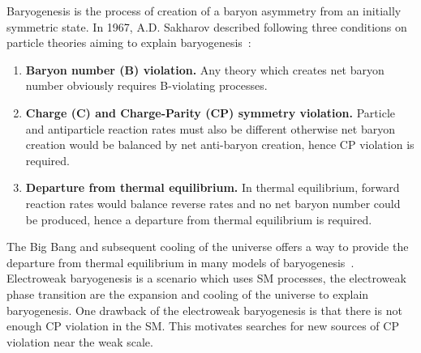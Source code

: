 
Baryogenesis is the process of creation of a baryon asymmetry from an initially symmetric state. In 1967, A.D. Sakharov described following three conditions on particle theories aiming to explain baryogenesis~\cite{Sakharov:1967dj}:
\begin{enumerate}
    \item {\bf Baryon number (B) violation.} Any theory which creates net baryon number obviously requires B-violating processes.
    \item {\bf Charge (C) and Charge-Parity (CP) symmetry violation.} Particle and antiparticle reaction rates must also be different otherwise net baryon creation would be balanced by net anti-baryon creation, hence CP violation is required.
    \item {\bf Departure from thermal equilibrium.} In thermal equilibrium, forward reaction rates would balance reverse rates and no net baryon number could be produced, hence a departure from thermal equilibrium is required.
\end{enumerate}

The Big Bang and subsequent cooling of the universe offers a way to provide the departure from thermal equilibrium in many models of baryogenesis~\cite{sakharov_3rd_cond}. Electroweak baryogenesis is a scenario which uses SM processes, the electroweak phase transition are the expansion and cooling of the universe to explain baryogenesis. One drawback of the electroweak baryogenesis is that there is not enough CP violation in the SM. This motivates searches for new sources of CP violation near the weak scale.


